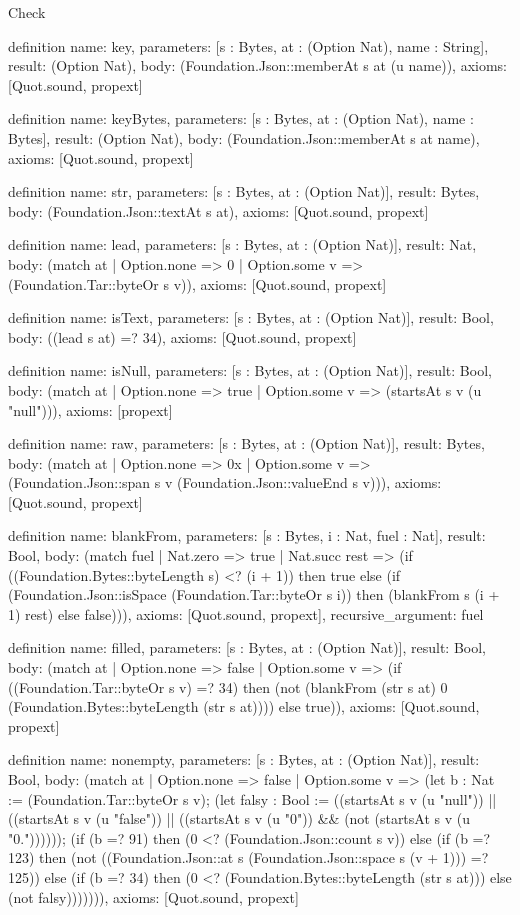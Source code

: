 \begin{lexlean}{Check}
\begin{semanticmodule}
definition{
  name: key,
  parameters: [s : Bytes, at : (Option Nat), name : String],
  result: (Option Nat),
  body: (Foundation.Json::memberAt s at (u name)),
  axioms: [Quot.sound, propext]
}

definition{
  name: keyBytes,
  parameters: [s : Bytes, at : (Option Nat), name : Bytes],
  result: (Option Nat),
  body: (Foundation.Json::memberAt s at name),
  axioms: [Quot.sound, propext]
}

definition{
  name: str,
  parameters: [s : Bytes, at : (Option Nat)],
  result: Bytes,
  body: (Foundation.Json::textAt s at),
  axioms: [Quot.sound, propext]
}

definition{
  name: lead,
  parameters: [s : Bytes, at : (Option Nat)],
  result: Nat,
  body: (match at | Option.none => 0 | Option.some v => (Foundation.Tar::byteOr s v)),
  axioms: [Quot.sound, propext]
}

definition{
  name: isText,
  parameters: [s : Bytes, at : (Option Nat)],
  result: Bool,
  body: ((lead s at) =? 34),
  axioms: [Quot.sound, propext]
}

definition{
  name: isNull,
  parameters: [s : Bytes, at : (Option Nat)],
  result: Bool,
  body: (match at | Option.none => true | Option.some v => (startsAt s v (u "null"))),
  axioms: [propext]
}

definition{
  name: raw,
  parameters: [s : Bytes, at : (Option Nat)],
  result: Bytes,
  body: (match at
    | Option.none => 0x
    | Option.some v => (Foundation.Json::span s v (Foundation.Json::valueEnd s v))),
  axioms: [Quot.sound, propext]
}

definition{
  name: blankFrom,
  parameters: [s : Bytes, i : Nat, fuel : Nat],
  result: Bool,
  body: (match fuel
    | Nat.zero => true
    | Nat.succ rest => (if ((Foundation.Bytes::byteLength s) <? (i + 1)) then true else (if (Foundation.Json::isSpace (Foundation.Tar::byteOr s i)) then (blankFrom s (i + 1) rest) else false))),
  axioms: [Quot.sound, propext],
  recursive_argument: fuel
}

definition{
  name: filled,
  parameters: [s : Bytes, at : (Option Nat)],
  result: Bool,
  body: (match at
    | Option.none => false
    | Option.some v => (if ((Foundation.Tar::byteOr s v) =? 34) then (not (blankFrom (str s at) 0 (Foundation.Bytes::byteLength (str s at)))) else true)),
  axioms: [Quot.sound, propext]
}

definition{
  name: nonempty,
  parameters: [s : Bytes, at : (Option Nat)],
  result: Bool,
  body: (match at
    | Option.none => false
    | Option.some v => (let b : Nat := (Foundation.Tar::byteOr s v); (let falsy : Bool := ((startsAt s v (u "null")) || ((startsAt s v (u "false")) || ((startsAt s v (u "0")) && (not (startsAt s v (u "0.")))))); (if (b =? 91) then (0 <? (Foundation.Json::count s v)) else (if (b =? 123) then (not ((Foundation.Json::at s (Foundation.Json::space s (v + 1))) =? 125)) else (if (b =? 34) then (0 <? (Foundation.Bytes::byteLength (str s at))) else (not falsy))))))),
  axioms: [Quot.sound, propext]
}


\end{semanticmodule}
\end{lexlean}
